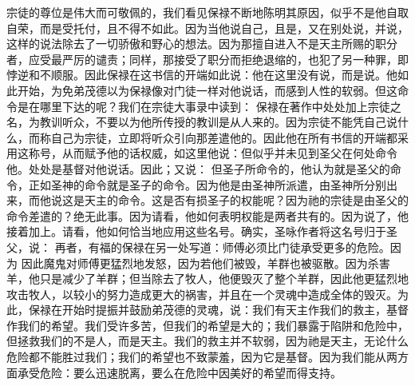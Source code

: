 \par

\par

宗徒的尊位是伟大而可敬佩的，我们看见保禄不断地陈明其原因，似乎不是他自取自荣，而是受托付，且不得不如此。因为当他说自己，且是，又在别处说，并说，这样的说法除去了一切骄傲和野心的想法。因为那擅自进入不是天主所赐的职分者，应受最严厉的谴责；同样，那接受了职分而拒绝退缩的，也犯了另一种罪，即悖逆和不顺服。因此保禄在这书信的开端如此说：他在这里没有说，而是说。他如此开始，为免弟茂德以为保禄像对门徒一样对他说话，而感到人性的软弱。但这命令是在哪里下达的呢？我们在宗徒大事录中读到： 保禄在著作中处处加上宗徒之名，为教训听众，不要以为他所传授的教训是从人来的。因为宗徒不能凭自己说什么，而称自己为宗徒，立即将听众引向那差遣他的。因此他在所有书信的开端都采用这称号，从而赋予他的话权威，如这里他说：但似乎并未见到圣父在何处命令他。处处是基督对他说话。因此；又说： 但圣子所命令的，他认为就是圣父的命令，正如圣神的命令就是圣子的命令。因为他是由圣神所派遣，由圣神所分别出来，而他说这是天主的命令。这是否有损圣子的权能呢？因为祂的宗徒是由圣父的命令差遣的？绝无此事。因为请看，他如何表明权能是两者共有的。因为说了，他接着加上。请看，他如何恰当地应用这些名号。确实，圣咏作者将这名号归于圣父，说： 再者，有福的保禄在另一处写道：师傅必须比门徒承受更多的危险。因为 因此魔鬼对师傅更猛烈地发怒，因为若他们被毁，羊群也被驱散。因为杀害羊，他只是减少了羊群；但当除去了牧人，他便毁灭了整个羊群，因此他更猛烈地攻击牧人，以较小的努力造成更大的祸害，并且在一个灵魂中造成全体的毁灭。为此，保禄在开始时提振并鼓励弟茂德的灵魂，说：我们有天主作我们的救主，基督作我们的希望。我们受许多苦，但我们的希望是大的；我们暴露于陷阱和危险中，但拯救我们的不是人，而是天主。我们的救主并不软弱，因为祂是天主，无论什么危险都不能胜过我们；我们的希望也不致蒙羞，因为它是基督。因为我们能从两方面承受危险：要么迅速脱离，要么在危险中因美好的希望而得支持。\par

